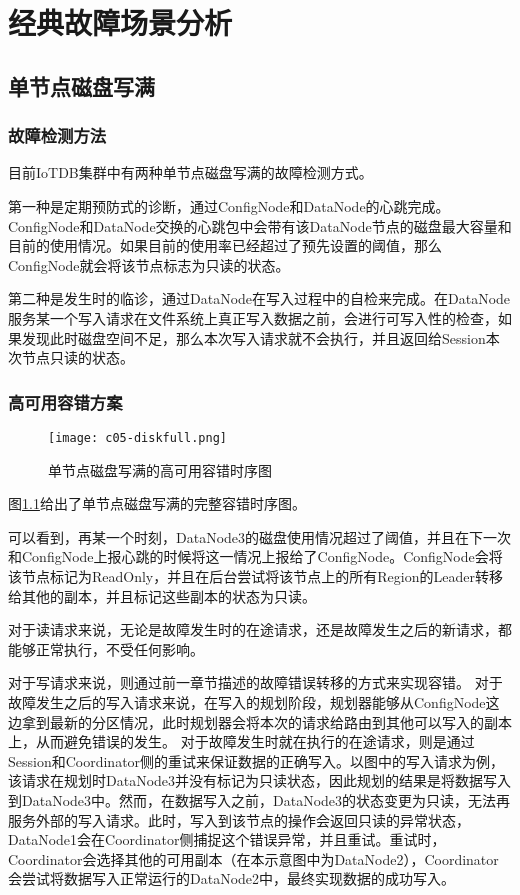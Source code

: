 
\chapter{经典故障场景分析}\label{chap-failure-scenarios}

\section{单节点磁盘写满}

\subsection{故障检测方法}

目前IoTDB集群中有两种单节点磁盘写满的故障检测方式。

第一种是定期预防式的诊断，通过ConfigNode和DataNode的心跳完成。ConfigNode和DataNode交换的心跳包中会带有该DataNode节点的磁盘最大容量和目前的使用情况。如果目前的使用率已经超过了预先设置的阈值，那么ConfigNode就会将该节点标志为只读的状态。

第二种是发生时的临诊，通过DataNode在写入过程中的自检来完成。在DataNode服务某一个写入请求在文件系统上真正写入数据之前，会进行可写入性的检查，如果发现此时磁盘空间不足，那么本次写入请求就不会执行，并且返回给Session本次节点只读的状态。

\subsection{高可用容错方案}

\begin{figure}
    \centering
    \texttt{[image: c05-diskfull.png]}
    \caption{单节点磁盘写满的高可用容错时序图}
    \label{fig:c05-diskfull}
  \end{figure}

图\ref{fig:c05-diskfull}给出了单节点磁盘写满的完整容错时序图。

可以看到，再某一个时刻，DataNode3的磁盘使用情况超过了阈值，并且在下一次和ConfigNode上报心跳的时候将这一情况上报给了ConfigNode。ConfigNode会将该节点标记为ReadOnly，并且在后台尝试将该节点上的所有Region的Leader转移给其他的副本，并且标记这些副本的状态为只读。

对于读请求来说，无论是故障发生时的在途请求，还是故障发生之后的新请求，都能够正常执行，不受任何影响。

对于写请求来说，则通过前一章节描述的故障错误转移的方式来实现容错。
对于故障发生之后的写入请求来说，在写入的规划阶段，规划器能够从ConfigNode这边拿到最新的分区情况，此时规划器会将本次的请求给路由到其他可以写入的副本上，从而避免错误的发生。
对于故障发生时就在执行的在途请求，则是通过Session和Coordinator侧的重试来保证数据的正确写入。以图中的写入请求为例，该请求在规划时DataNode3并没有标记为只读状态，因此规划的结果是将数据写入到DataNode3中。然而，在数据写入之前，DataNode3的状态变更为只读，无法再服务外部的写入请求。此时，写入到该节点的操作会返回只读的异常状态，DataNode1会在Coordinator侧捕捉这个错误异常，并且重试。重试时，Coordinator会选择其他的可用副本（在本示意图中为DataNode2），Coordinator会尝试将数据写入正常运行的DataNode2中，最终实现数据的成功写入。


